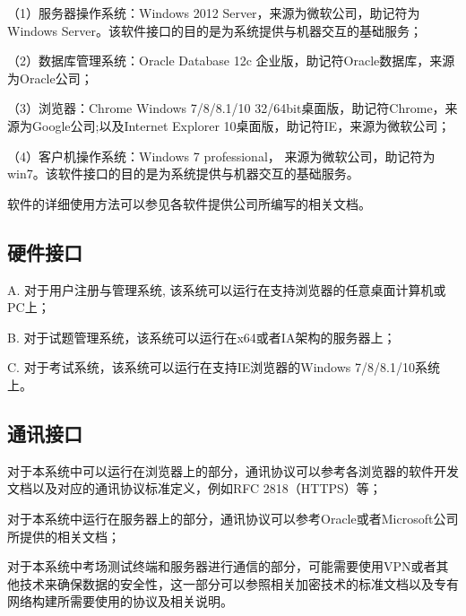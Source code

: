 （1）服务器操作系统：Windows 2012 Server，来源为微软公司，助记符为Windows Server。该软件接口的目的是为系统提供与机器交互的基础服务；

（2）数据库管理系统：Oracle Database 12c 企业版，助记符Oracle数据库，来源为Oracle公司；

（3）浏览器：Chrome Windows 7/8/8.1/10 32/64bit桌面版，助记符Chrome，来源为Google公司;以及Internet Explorer 10桌面版，助记符IE，来源为微软公司；

（4）客户机操作系统：Windows 7 professional， 来源为微软公司，助记符为win7。该软件接口的目的是为系统提供与机器交互的基础服务。

软件的详细使用方法可以参见各软件提供公司所编写的相关文档。

\subsection{硬件接口}
A. 对于用户注册与管理系统, 该系统可以运行在支持浏览器的任意桌面计算机或PC上；

B. 对于试题管理系统，该系统可以运行在x64或者IA架构的服务器上；

C. 对于考试系统，该系统可以运行在支持IE浏览器的Windows 7/8/8.1/10系统上。

\subsection{通讯接口}
对于本系统中可以运行在浏览器上的部分，通讯协议可以参考各浏览器的软件开发文档以及对应的通讯协议标准定义，例如RFC 2818（HTTPS）等；

对于本系统中运行在服务器上的部分，通讯协议可以参考Oracle或者Microsoft公司所提供的相关文档；

对于本系统中考场测试终端和服务器进行通信的部分，可能需要使用VPN或者其他技术来确保数据的安全性，这一部分可以参照相关加密技术的标准文档以及专有网络构建所需要使用的协议及相关说明。
